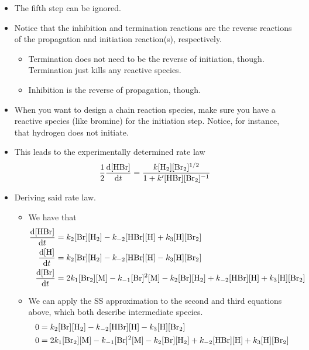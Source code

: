 \documentclass[../notes.tex]{subfiles}
\begin{document}
\begin{itemize}
\begin{itemize}
        \item The fifth step can be ignored.
        \item Notice that the inhibition and termination reactions are the reverse reactions of the propagation and initiation reaction(s), respectively.
        \begin{itemize}
            \item Termination does not need to be the reverse of initiation, though. Termination just kills any reactive species.
            \item Inhibition is the reverse of propagation, though.
        \end{itemize}
        \item When you want to design a chain reaction species, make sure you have a reactive species (like bromine) for the initiation step. Notice, for instance, that hydrogen does not initiate.
        \item This leads to the experimentally determined rate law
        \begin{equation*}
            \frac{1}{2}\dv{[\ce{HBr}]}{t} = \frac{k[\ce{H2}][\ce{Br2}]^{1/2}}{1+k'[\ce{HBr}][\ce{Br2}]^{-1}}
        \end{equation*}
        \item Deriving said rate law.
        \begin{itemize}
            \item We have that
            \begin{align*}
                \dv{[\ce{HBr}]}{t} &= k_2[\ce{Br}][\ce{H2}]-k_{-2}[\ce{HBr}][\ce{H}]+k_3[\ce{H}][\ce{Br2}]\\
                \dv{[\ce{H}]}{t} &= k_2[\ce{Br}][\ce{H2}]-k_{-2}[\ce{HBr}][\ce{H}]-k_3[\ce{H}][\ce{Br2}]\\
                \dv{[\ce{Br}]}{t} &= 2k_1[\ce{Br2}][\ce{M}]-k_{-1}[\ce{Br}]^2[\ce{M}]-k_2[\ce{Br}][\ce{H2}]+k_{-2}[\ce{HBr}][\ce{H}]+k_3[\ce{H}][\ce{Br2}]
            \end{align*}
            \item We can apply the SS approximation to the second and third equations above, which both describe intermediate species.
            \begin{align*}
                0 &= k_2[\ce{Br}][\ce{H2}]-k_{-2}[\ce{HBr}][\ce{H}]-k_3[\ce{H}][\ce{Br2}]\\
                0 &= 2k_1[\ce{Br2}][\ce{M}]-k_{-1}[\ce{Br}]^2[\ce{M}]-k_2[\ce{Br}][\ce{H2}]+k_{-2}[\ce{HBr}][\ce{H}]+k_3[\ce{H}][\ce{Br2}]
            \end{align*}

\end{itemize}
\end{itemize}
\end{itemize}
\end{document}
